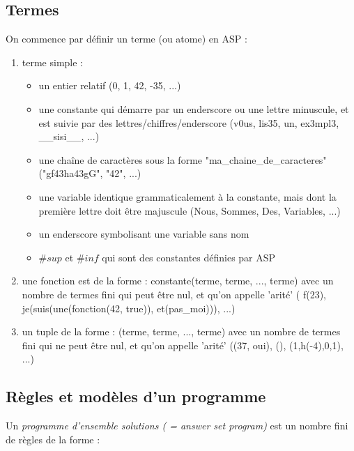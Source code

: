 \documentclass[12pt,a4paper]{article}
\begin{document}
\subsection{Termes}
On commence par définir un terme (ou atome) en ASP :
\begin{enumerate}
	\item terme simple :
		\begin{itemize}
		\item un entier relatif (0, 1, 42, -35, ...)
		\item une constante qui démarre par un enderscore ou une lettre minuscule, et est suivie par des lettres/chiffres/enderscore (v0us, lis35, un, ex3mpl3, \_\_sisi\_\_, ...)
		\item une chaîne de caractères sous la forme "ma\_chaine\_de\_caracteres" ("gf43ha43gG", "42", ...)
		\item une variable identique grammaticalement à la constante, mais dont la première lettre doit être majuscule (Nous, Sommes, Des, Variables, ...)
		\item un enderscore symbolisant une variable sans nom
		\item $\#sup$ et $\#inf$ qui sont des constantes définies par ASP
		\end{itemize}
	\item une fonction est de la forme : constante(terme, terme, ..., terme) avec un nombre de termes fini qui peut être nul, et qu'on appelle 'arité' ( f(23), je(suis(une(fonction(42, true)), et(pas\_moi))), ...)
	\item un tuple de la forme : (terme, terme, ..., terme) avec un nombre de termes fini qui ne peut être nul, et qu'on appelle 'arité' ((37, oui), (), (1,h(-4),0,1), ...)
\end{enumerate}
\subsection{Règles et modèles d'un programme}
Un \emph{programme d'ensemble solutions ( = answer set program)} est un nombre fini de règles de la forme :
\end{document}
